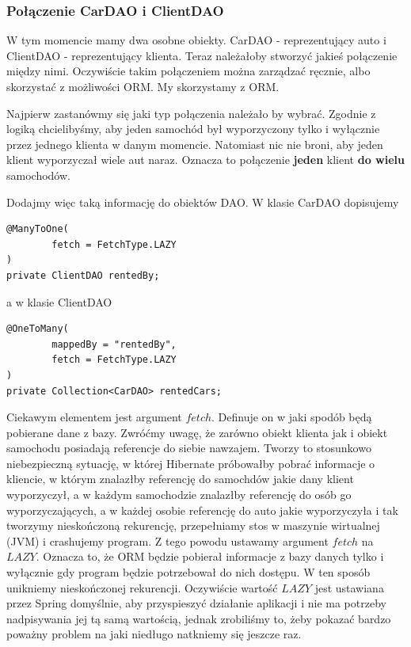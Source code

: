 \documentclass{article}
\begin{document}
        \subsubsection{Połączenie CarDAO i ClientDAO}
            W tym momencie mamy dwa osobne obiekty. CarDAO - reprezentujący auto i ClientDAO - reprezentujący klienta. Teraz należałoby stworzyć jakieś połączenie między nimi. Oczywiście takim połączeniem można zarządzać ręcznie, albo skorzystać z możliwości ORM. My skorzystamy z ORM. 
            
            Najpierw zastanówmy się jaki typ połączenia należało by wybrać. Zgodnie z logiką chcielibyśmy, aby jeden samochód był wyporzyczony tylko i wyłącznie przez jednego klienta w danym momencie. Natomiast nic nie broni, aby jeden klient wyporzyczał wiele aut naraz. Oznacza to połączenie \textbf{jeden} klient \textbf{do wielu} samochodów. 
            
            Dodajmy więc taką informację do obiektów DAO. W klasie CarDAO dopisujemy
            \begin{verbatim}
@ManyToOne(
        fetch = FetchType.LAZY
)
private ClientDAO rentedBy;
            \end{verbatim}
            a w klasie ClientDAO
            \begin{verbatim}
@OneToMany(
        mappedBy = "rentedBy",
        fetch = FetchType.LAZY
)
private Collection<CarDAO> rentedCars;
            \end{verbatim}
            Ciekawym elementem jest argument $fetch$. Definuje on  w jaki spodób będą pobierane dane z bazy. Zwróćmy uwagę, że zarówno obiekt klienta jak i obiekt samochodu posiadają referencje do siebie nawzajem. Tworzy to stosunkowo niebezpieczną sytuację, w której Hibernate próbowałby pobrać informacje o kliencie, w którym znalazłby referencję do samochdów jakie dany klient wyporzyczył, a w każdym samochodzie znalazłby referencję do osób go wyporzyczających, a w każdej osobie referencję do auto jakie wyporzyczyła i tak tworzymy nieskończoną rekurencję, przepełniamy stos w maszynie wirtualnej (JVM) i crashujemy program. Z tego powodu ustawamy argument $fetch$ na $LAZY$. Oznacza to, że ORM będzie pobierał informacje z bazy danych tylko i wyłącznie gdy program będzie potrzebował do nich dostępu. W ten sposób unikniemy nieskończonej rekurencji. Oczywiście wartość $LAZY$ jest ustawiana przez Spring domyślnie, aby przyspieszyć działanie aplikacji i nie ma potrzeby nadpisywania jej tą samą wartością, jednak zrobiliśmy to, żeby pokazać bardzo poważny problem na jaki niedługo natkniemy się jeszcze raz.
\end{document}
